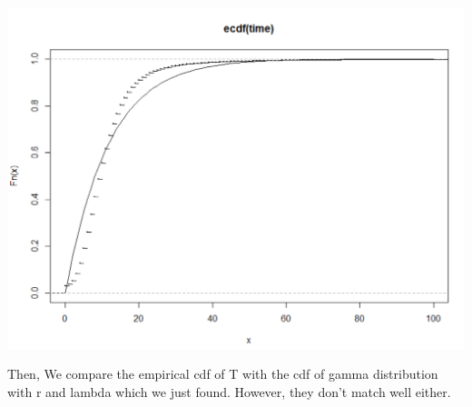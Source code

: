 \documentclass[11pt]{article}
\begin{document}
\includegraphics[scale = .50]{cdf_p1_1.png}

\par
Then, We compare the empirical cdf of T with the cdf of gamma distribution with r and lambda which we just found.
 However, they don’t match well either. \\
\end{document}
